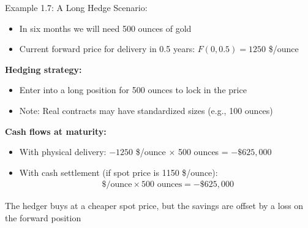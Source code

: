 \documentclass[10pt,handout]{beamer}
\begin{document}
\begin{frame}{Example 1.7: A Long Hedge}
  Scenario:
  \begin{itemize}
    \item In six months we will need 500 ounces of gold
    \item Current forward price for delivery in 0.5 years: $F(0, 0.5) = 1250$ \$/ounce
  \end{itemize}
  
  \pause
  \textbf{Hedging strategy:}
  \begin{itemize}
    \item Enter into a long position for 500 ounces to lock in the price
    \item Note: Real contracts may have standardized sizes (e.g., 100 ounces)
  \end{itemize}
  
  \pause
  \textbf{Cash flows at maturity:}
  \begin{itemize}
    \item With physical delivery: $-1250$ \$/ounce $\times$ 500 ounces = $-\$625,000$
    
    \item With cash settlement (if spot price is 1150 \$/ounce):
    \begin{align*}
      [(1150 - 1250) - 1150]\text{ \$/ounce} \times 500\text{ ounces} = -\$625,000
    \end{align*}
  \end{itemize}
  
  \pause
  The hedger buys at a cheaper spot price, but the savings are offset by a loss on the forward position
\end{frame}
\end{document}

